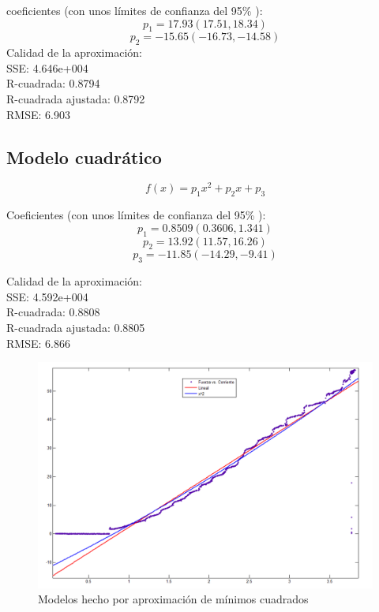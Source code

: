 coeficientes (con unos límites de confianza del 95\% ):
		$$       p_1 =       17.93  (17.51, 18.34)$$       
       $$       p_2 =      -15.65  (-16.73, -14.58) $$
  Calidad de la aproximación:\\
  SSE: 4.646e+004\\
  R-cuadrada: 0.8794\\
  R-cuadrada ajustada: 0.8792\\  
  RMSE: 6.903


\subsection*{Modelo cuadrático}
\begin{equation}
     f(x) = p_1 x^2 + p_2x + p_3
\end{equation}

Coeficientes (con unos límites de confianza del 95\% ):
$$     p_1 =      0.8509  (0.3606, 1.341)$$
$$       p_2 =       13.92  (11.57, 16.26)$$       
$$       p_3 =      -11.85  (-14.29, -9.41)$$

  Calidad de la aproximación:\\
  SSE: 4.592e+004\\
  R-cuadrada: 0.8808\\
  R-cuadrada ajustada: 0.8805\\
  RMSE: 6.866





\begin{figure}[htb!]
\centering
\includegraphics[scale=0.5]{FiguresP/ModeloFC}
\caption{Modelos hecho por aproximación de mínimos cuadrados}
\label{fig:curveFitting}
\end{figure}

